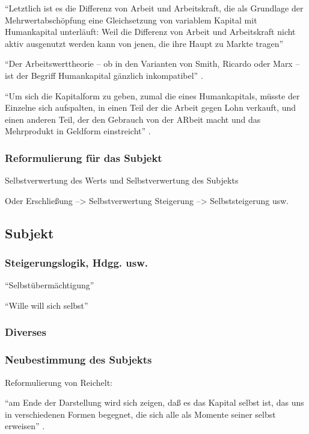 \documentclass[12pt,
               DIV13,
               paper=a4,
               twoside=false,
               onehalfspacing,
               bibliography=totoc,
               toc=graduated,
               draft,
               ]{scrartcl}
\newcommand{\pc}[2]{\parencite[#1]{#2}}
\begin{document}
"`Letztlich ist es die Differenz von Arbeit und Arbeitskraft, die als
Grundlage der Mehrwertabschöpfung eine Gleichsetzung von variablem
Kapital mit Humankapital unterläuft: Weil die Differenz von Arbeit und
Arbeitskraft nicht aktiv ausgenutzt werden kann von jenen, die ihre
Haupt zu Markte tragen"' \pc{126}{strauss}

"`Der Arbeitswerttheorie -- ob in den Varianten von Smith, Ricardo
oder Marx -- ist der Begriff Humankapital gänzlich inkompatibel"'
\pc{124}{strauss}.

"`Um sich die Kapitalform zu geben, zumal die eines Humankapitals,
müsste der Einzelne sich aufspalten, in einen Teil der die Arbeit
gegen Lohn verkauft, und einen anderen Teil, der den Gebrauch von der
ARbeit macht und das Mehrprodukt in Geldform einstreicht"'
\pc{126}{strauss}.

\subsubsection{Reformulierung für das Subjekt}

Selbstverwertung des Werts und Selbstverwertung des Subjekts

Oder Erschließung --> Selbstverwertung
Steigerung --> Selbststeigerung usw.

\subsection{Subjekt}

\subsubsection{Steigerungslogik, Hdgg. usw.}

"`Selbstübermächtigung"'

"`Wille will sich selbst"'

\subsubsection{Diverses}

\subsubsection{Neubestimmung des Subjekts}

Reformulierung von Reichelt:

"`am Ende der Darstellung wird sich zeigen, daß es das Kapital selbst
ist, das uns in verschiedenen Formen begegnet, die sich alle als
Momente seiner selbst erweisen"' \pc{181}{reichelt}.
\end{document}
